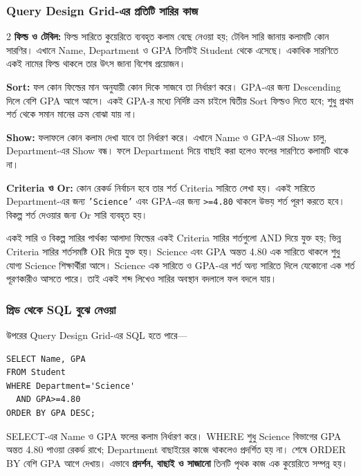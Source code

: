 \subsubsection{Query Design Grid-এর প্রতিটি সারির কাজ}
\begin{multicols}{2}
\textbf{ফিল্ড ও টেবিল:} ফিল্ড সারিতে কুয়েরিতে ব্যবহৃত কলাম বেছে নেওয়া হয়; টেবিল সারি জানায় কলামটি কোন সারণির। এখানে Name, Department ও GPA তিনটিই Student থেকে এসেছে। একাধিক সারণিতে একই নামের ফিল্ড থাকলে তার উৎস জানা বিশেষ প্রয়োজন।

\textbf{Sort:} ফল কোন ফিল্ডের মান অনুযায়ী কোন দিকে সাজবে তা নির্ধারণ করে। GPA-এর জন্য Descending দিলে বেশি GPA আগে আসে। একই GPA-র মধ্যে নির্দিষ্ট ক্রম চাইলে দ্বিতীয় Sort ফিল্ডও দিতে হবে; শুধু প্রথম শর্ত থেকে সমান মানের ক্রম বোঝা যায় না।

\textbf{Show:} ফলাফলে কোন কলাম দেখা যাবে তা নির্ধারণ করে। এখানে Name ও GPA-এর Show চালু, Department-এর Show বন্ধ। ফলে Department দিয়ে বাছাই করা হলেও ফলের সারণিতে কলামটি থাকে না।

\textbf{Criteria ও Or:} কোন রেকর্ড নির্বাচন হবে তার শর্ত Criteria সারিতে লেখা হয়। একই সারিতে Department-এর জন্য \texttt{'Science'} এবং GPA-এর জন্য \texttt{>=4.80} থাকলে উভয় শর্ত পূরণ করতে হবে। বিকল্প শর্ত দেওয়ার জন্য Or সারি ব্যবহৃত হয়।
\end{multicols}
\begin{boardbox}{একই সারি ও বিকল্প সারির পার্থক্য}
আলাদা ফিল্ডের একই Criteria সারির শর্তগুলো AND দিয়ে যুক্ত হয়; ভিন্ন Criteria সারির শর্তসমষ্টি OR দিয়ে যুক্ত হয়। Science এবং GPA অন্তত 4.80 এক সারিতে থাকলে শুধু যোগ্য Science শিক্ষার্থীরা আসে। Science এক সারিতে ও GPA-এর শর্ত অন্য সারিতে দিলে যেকোনো এক শর্ত পূরণকারীও আসতে পারে। তাই একই শব্দ লিখেও সারির অবস্থান বদলালে ফল বদলে যায়।
\end{boardbox}

\subsubsection{গ্রিড থেকে SQL বুঝে নেওয়া}

উপরের Query Design Grid-এর SQL হতে পারে—

\begin{chSixSideBySide}[.48]
\par\noindent\begin{minipage}{\linewidth}
\begin{verbatim}
SELECT Name, GPA
FROM Student
WHERE Department='Science'
  AND GPA>=4.80
ORDER BY GPA DESC;
\end{verbatim}
\end{minipage}\par
\chSixNextColumn
SELECT-এর Name ও GPA ফলের কলাম নির্ধারণ করে। WHERE শুধু Science বিভাগের GPA অন্তত 4.80 পাওয়া রেকর্ড রাখে; Department বাছাইয়ের কাজে থাকলেও প্রদর্শিত হয় না। শেষে ORDER BY বেশি GPA আগে দেখায়। এভাবে \textbf{প্রদর্শন, বাছাই ও সাজানো} তিনটি পৃথক কাজ এক কুয়েরিতে সম্পন্ন হয়।
\end{chSixSideBySide}

